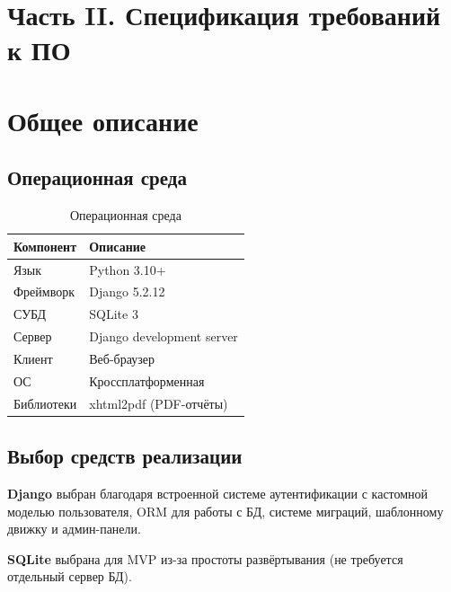 \documentclass[14pt,a4paper]{extarticle}
\begin{document}
\newpage


\section*{Часть II. Спецификация требований к ПО}

\section{Общее описание}

\subsection{Операционная среда}

\begin{table}[H]
\centering
\caption{Операционная среда}
\label{tab:env}
\small
\begin{tabular}{|L{4cm}|L{9cm}|}
\hline
\textbf{Компонент} & \textbf{Описание} \\
\hline
Язык & Python 3.10+ \\
\hline
Фреймворк & Django 5.2.12 \\
\hline
СУБД & SQLite 3 \\
\hline
Сервер & Django development server \\
\hline
Клиент & Веб-браузер \\
\hline
ОС & Кроссплатформенная \\
\hline
Библиотеки & xhtml2pdf (PDF-отчёты) \\
\hline
\end{tabular}
\end{table}

\subsection{Выбор средств реализации}

\textbf{Django} выбран благодаря встроенной системе аутентификации с кастомной моделью пользователя, ORM для работы с БД, системе миграций, шаблонному движку и админ-панели.

\textbf{SQLite} выбрана для MVP из-за простоты развёртывания (не требуется отдельный сервер БД).
\end{document}
